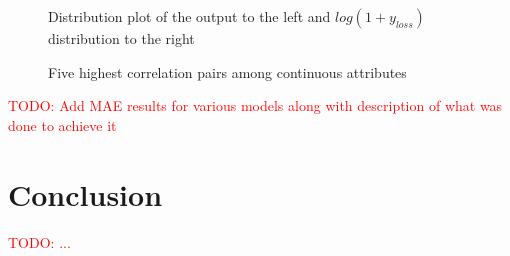 \documentclass[a4paper]{article}
\newcommand\todo[1]{\textcolor{red}{TODO: #1}}
\begin{document}
\begin{figure}[H]
\centering
{}
\caption{Distribution plot of the output to the left and $log(1 + y_{loss})$ distribution to the right}
\label{fig:loss}
\end{figure}
\begin{figure}[H]
\centering
{}
\caption{Five highest correlation pairs among continuous attributes}
\label{fig:con-corr}
\end{figure}

\todo{Add MAE results for various models along with description of what was done to achieve it}




\section{Conclusion}
\todo{...}
\end{document}
